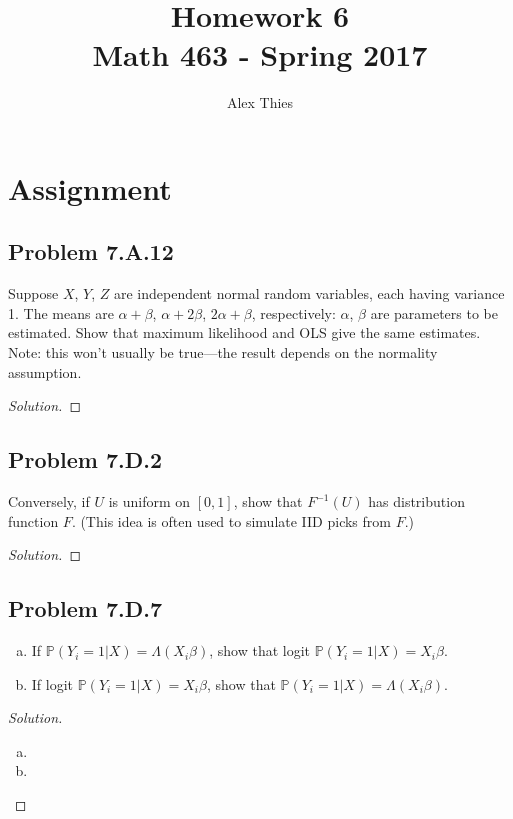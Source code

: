 \documentclass{amsart}
\author{Alex Thies}
\title{Homework 6 \\ Math 463 - Spring 2017}
\begin{document}

	\maketitle

	\section{Assignment} %
	\label{sec:assignment}
		\subsection{Problem 7.A.12} %
		\label{sub:problem_7_a_12}
			Suppose $X$, $Y$, $Z$ are independent normal random variables, each having variance 1. 
			The means are $\alpha + \beta$, $\alpha + 2\beta$, $2\alpha + \beta$, respectively: $\alpha$, $\beta$ are parameters to be estimated. 
			Show that maximum likelihood and OLS give the same estimates. 
			Note: this won’t usually be true—the result depends on the normality assumption.
		\begin{proof}[Solution]
		\end{proof}

		\subsection{Problem 7.D.2} %
		\label{sub:problem_7_d_2}
			Conversely, if $U$ is uniform on $[0,1]$, show that $F^{-1}(U)$ has distribution function $F$.
			(This idea is often used to simulate IID picks from $F$.)
		\begin{proof}[Solution]
		\end{proof}

		\subsection{Problem 7.D.7} %
		\label{sub:problem_7_d_7}
			\begin{enumerate}[(a)]
				\item If $\mathbb{P}(Y_{i} = 1|X) = \Lambda(X_{i}\beta)$, show that logit $\mathbb{P}(Y_{i} = 1|X) = X_{i}\beta$.
				\item If logit $\mathbb{P}(Y_{i} = 1|X) = X_{i}\beta$, show that $\mathbb{P}(Y_{i} = 1|X) = \Lambda(X_{i}\beta)$.
			\end{enumerate}
		\begin{proof}[Solution] \
			\begin{enumerate}[(a)]
				\item 
				\item 
			\end{enumerate}
		\end{proof}
\end{document}
